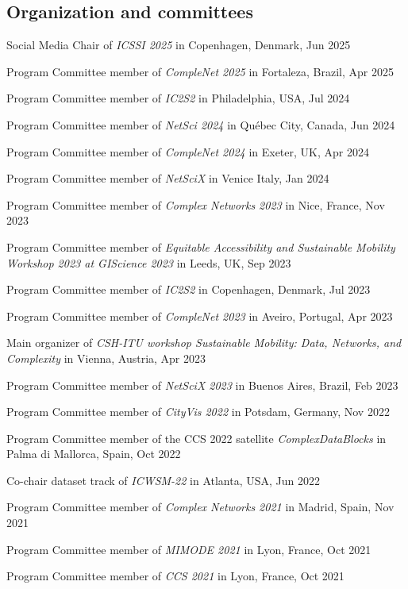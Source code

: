 \documentclass[10pt,a4paper]{article}
\renewenvironment{itemize}{
  \begin{list}{}{
    \setlength{\leftmargin}{1.5em}
    \setlength{\itemsep}{0.25em}
    \setlength{\parskip}{0pt}
    \setlength{\parsep}{0.25em}
  }
}{
  \end{list}
}
\begin{document}
\subsection*{Organization and committees}
\begin{itemize}
\item{Social Media Chair of \emph{ICSSI 2025} in Copenhagen, Denmark, Jun 2025}
\item{Program Committee member of \emph{CompleNet 2025} in Fortaleza, Brazil, Apr 2025}
\item{Program Committee member of \emph{IC2S2} in Philadelphia, USA, Jul 2024}
\item{Program Committee member of \emph{NetSci 2024} in Québec City, Canada, Jun 2024}
\item{Program Committee member of \emph{CompleNet 2024} in Exeter, UK, Apr 2024}
\item{Program Committee member of \emph{NetSciX} in Venice Italy, Jan 2024}
\item{Program Committee member of \emph{Complex Networks 2023} in Nice, France, Nov 2023}
\item{Program Committee member of \emph{Equitable Accessibility and Sustainable Mobility Workshop 2023 at GIScience 2023} in Leeds, UK, Sep 2023}
\item{Program Committee member of \emph{IC2S2} in Copenhagen, Denmark, Jul 2023}
\item{Program Committee member of \emph{CompleNet 2023} in Aveiro, Portugal, Apr 2023}
\item{Main organizer of \emph{CSH-ITU workshop Sustainable Mobility: Data, Networks, and Complexity} in Vienna, Austria, Apr 2023}
\item{Program Committee member of \emph{NetSciX 2023} in Buenos Aires, Brazil, Feb 2023}
\item{Program Committee member of \emph{CityVis 2022} in Potsdam, Germany, Nov 2022}
\item{Program Committee member of the CCS 2022 satellite \emph{ComplexDataBlocks} in Palma di Mallorca, Spain, Oct 2022}
\item{Co-chair dataset track of \emph{ICWSM-22} in Atlanta, USA, Jun 2022}
\item{Program Committee member of \emph{Complex Networks 2021} in Madrid, Spain, Nov 2021}
\item{Program Committee member of \emph{MIMODE 2021} in Lyon, France, Oct 2021}
\item{Program Committee member of \emph{CCS 2021} in Lyon, France, Oct 2021}

\end{itemize}
\end{document}
